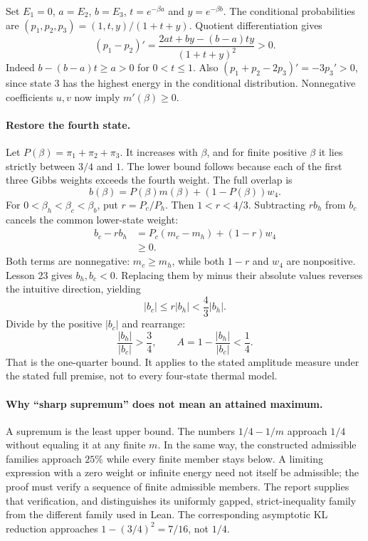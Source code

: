 Set $E_1=0$, $a=E_2$, $b=E_3$, $t=e^{-\beta a}$ and $y=e^{-\beta b}$.
The conditional probabilities are $(p_1,p_2,p_3)=(1,t,y)/(1+t+y)$.
Quotient differentiation gives
\[
(p_1-p_2)'=\frac{2at+by-(b-a)ty}{(1+t+y)^2}>0.
\]
Indeed $b-(b-a)t\geq a>0$ for $0<t\leq1$. Also
$(p_1+p_2-2p_3)'=-3p_3'>0$, since state $3$ has the highest energy
in the conditional distribution. Nonnegative coefficients $u,v$ now imply
$m'(\beta)\geq0$.

\paragraph{Restore the fourth state.}
Let $P(\beta)=\pi_1+\pi_2+\pi_3$. It increases with $\beta$, and for
finite positive $\beta$ it lies strictly between $3/4$ and $1$.
The lower bound follows because each of the first three Gibbs weights
exceeds the fourth weight. The full overlap is
\[
b(\beta)=P(\beta)m(\beta)+(1-P(\beta))w_4.
\]
For $0<\beta_h<\beta_c<\beta_b$, put $r=P_c/P_h$. Then $1<r<4/3$.
Subtracting $rb_h$ from $b_c$ cancels the common lower-state weight:
\begin{align*}
b_c-rb_h
&=P_c(m_c-m_h)+(1-r)w_4\\
&\geq0.
\end{align*}
Both terms are nonnegative: $m_c\geq m_h$, while both $1-r$ and $w_4$
are nonpositive. Lesson 23 gives $b_h,b_c<0$. Replacing them by minus their
absolute values reverses the intuitive direction, yielding
\[
|b_c|\leq r|b_h|<\frac43|b_h|.
\]
Divide by the positive $|b_c|$ and rearrange:
\[
\frac{|b_h|}{|b_c|}>\frac34,
\qquad A=1-\frac{|b_h|}{|b_c|}<\frac14.
\]
That is the one-quarter bound. It applies to the stated amplitude measure
under the stated full premise, not to every four-state thermal model.

\paragraph{Why ``sharp supremum'' does not mean an attained maximum.}
A supremum is the least upper bound. The numbers $1/4-1/m$ approach $1/4$
without equaling it at any finite $m$. In the same way, the constructed
admissible families approach $25\%$ while every finite member stays below.
A limiting expression with a zero weight or infinite energy need not itself
be admissible; the proof must verify a sequence of finite admissible members.
The report supplies that verification, and distinguishes its uniformly
gapped, strict-inequality family from the different family used in Lean.
The corresponding asymptotic KL reduction approaches
$1-(3/4)^2=7/16$, not $1/4$.


